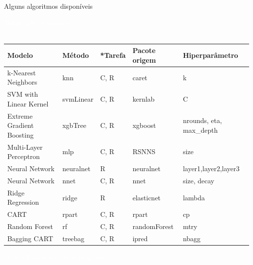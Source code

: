 \documentclass[12pt,ignorenonframetext,aspectratio=1610]{beamer}
\begin{document}
\begin{frame}[t]{Alguns algoritmos disponíveis}

\hspace{5cm}\textcolor{white}{\textbf{Total}: 238 algoritmos} \\~\\

\begin{adjustbox}{max width=\textwidth}
\begin{tabular}{@{}lllll@{}}
\toprule
\rowcolor{LightCyan}
\textbf{Modelo}          & \textbf{Método}   & \textbf{*Tarefa}    & \textbf{Pacote origem}       & \textbf{Hiperparâmetro} \\ \midrule
\rowcolor{LightCyan}
k-Nearest Neighbors     & knn               & C, R               & caret        & k                      \\
\rowcolor{LightCyan}
SVM with Linear Kernel  & svmLinear         & C, R   & kernlab      & C                      \\
\rowcolor{LightCyan}
Extreme Gradient Boosting
  & xgbTree        & C, R   & xgboost        & nrounds, eta, max\_depth                   \\
\rowcolor{LightCyan}
Multi-Layer Perceptron  & mlp               & C, R   & RSNNS        & size                   \\
\rowcolor{LightCyan}
Neural Network          & neuralnet         & R      & neuralnet    & layer1,layer2,layer3   \\
\rowcolor{LightCyan}
Neural Network          & nnet              & C, R   & nnet         & size, decay            \\
\rowcolor{LightCyan}
Ridge Regression        & ridge             & R      & elasticnet   & lambda                 \\
\rowcolor{LightCyan}
CART                    & rpart             & C, R   & rpart        & cp                     \\
\rowcolor{LightCyan}
Random Forest           & rf                & C, R   & randomForest & mtry                   \\
\rowcolor{LightCyan}
Bagging CART           & treebag                & C, R   & ipred & nbagg                   \\ \bottomrule
\end{tabular}
\end{adjustbox}
\textcolor{white}{*C = Classificação; R = Regressão}
\end{frame}
\end{document}

